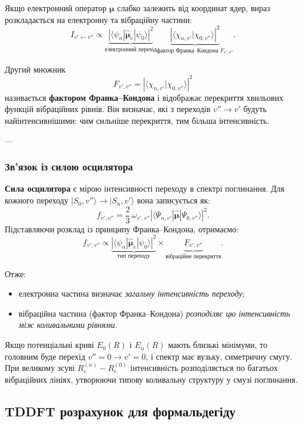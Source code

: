 Якщо електронний оператор $\hat{\boldsymbol{\mu}}$ слабко залежить від координат ядер,
вираз розкладається на електронну та вібраційну частини:
\[
I_{v'\!\leftarrow\!v''} \propto
\underbrace{
\left| \langle \psi_n | \hat{\boldsymbol{\mu}}_e | \psi_0 \rangle \right|^2
}_{\text{електронний перехід}}
\underbrace{
\left| \langle \chi_{n,v'} | \chi_{0,v''} \rangle \right|^2
}_{\text{фактор Франка–Кондона }F_{v'\!,v''}}.
\]

Другий множник
\[
F_{v'\!,v''} = \left| \langle \chi_{n,v'} | \chi_{0,v''} \rangle \right|^2
\]
називається \textbf{фактором Франка–Кондона}
і відображає перекриття хвильових функцій вібраційних рівнів.
Він визначає, які з переходів $v''\!\to v'$ будуть найінтенсивнішими:
чим сильніше перекриття, тим більша інтенсивність.

---

\subsubsection*{Зв’язок із силою осцилятора}

\textbf{Сила осцилятора} є мірою інтенсивності переходу в спектрі поглинання.
Для кожного переходу $|S_0,v''\rangle \to |S_n,v'\rangle$ вона записується як:
\[
f_{v'\!,v''} = \frac{2}{3}\,\omega_{v'\!,v''}
\left| \langle \Psi_{n,v'} | \hat{\boldsymbol{\mu}} | \Psi_{0,v''} \rangle \right|^2.
\]
Підставляючи розклад із принципу Франка–Кондона, отримаємо:
\[
f_{v'\!,v''} \propto
\underbrace{\left| \langle \psi_n | \hat{\boldsymbol{\mu}}_e | \psi_0 \rangle \right|^2}_{\text{тип переходу}}
\times
\underbrace{F_{v'\!,v''}}_{\text{вібраційне перекриття}}.
\]

Отже:
\begin{itemize}
\item електронна частина визначає \emph{загальну інтенсивність переходу};
\item вібраційна частина (фактор Франка–Кондона) \emph{розподіляє цю інтенсивність між коливальними рівнями}.
\end{itemize}

Якщо потенціальні криві $E_0(R)$ і $E_n(R)$ мають близькі мінімуми,
то головним буде перехід $v''=0 \to v'=0$,
і спектр має вузьку, симетричну смугу.
При великому зсуві $R_e^{(n)}-R_e^{(0)}$ інтенсивність розподіляється
по багатьох вібраційних лініях, утворюючи типову коливальну структуру у смузі поглинання.


\subsection{TDDFT розрахунок для формальдегіду}


